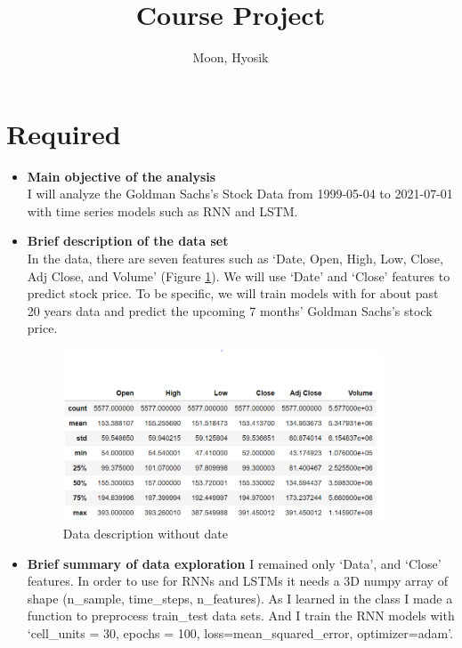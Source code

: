 \documentclass[12pt]{article}
\title{Course Project}
\author{
  Moon, Hyosik
  }
\begin{document}
\maketitle

\section{Required}

\begin{itemize}
\item \textbf{Main objective of the analysis} \\
I will analyze the Goldman Sachs's Stock Data from 1999-05-04 to 2021-07-01 with time series models such as RNN and LSTM.

\item \textbf{Brief description of the data set} \\
In the data, there are seven features such as `Date, Open, High, Low, Close, Adj Close, and Volume' (Figure \ref{data}). We will use `Date' and `Close' features to predict stock price. To be specific, we will train models with for about past 20 years data and predict the upcoming 7 months' Goldman Sachs's stock price.

\begin{figure}[H]
  \centering
  \includegraphics[width=0.9\textwidth]{figures/data.png}
  \caption{Data description without date}\label{data}
\end{figure}

\item \textbf{Brief summary of data exploration}
I remained only `Data', and `Close' features. In order to use for RNNs and LSTMs it needs a 3D numpy array of shape (n\_sample, time\_steps, n\_features). As I learned in the class I made a function to preprocess train\_test data sets. And I train the RNN models with `cell\_units = 30, epochs = 100, loss=mean\_squared\_error, optimizer=adam'.


\end{itemize}
\end{document}
